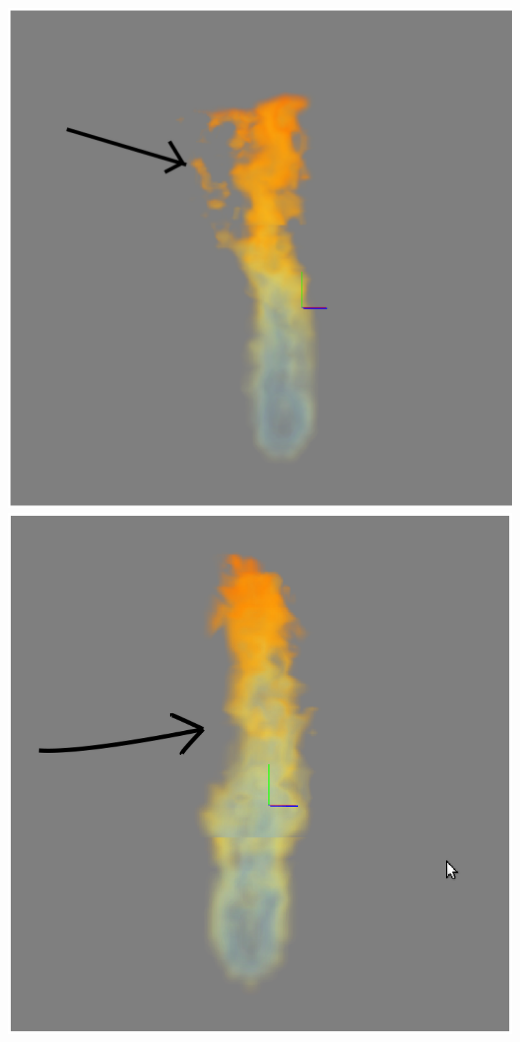 \documentclass[a4paper,10pt]{article}
\begin{document}
\includegraphics[scale=0.3]{Perlin1.ps}
\includegraphics[scale=0.3]{Perlin2.ps}
\end{document}

